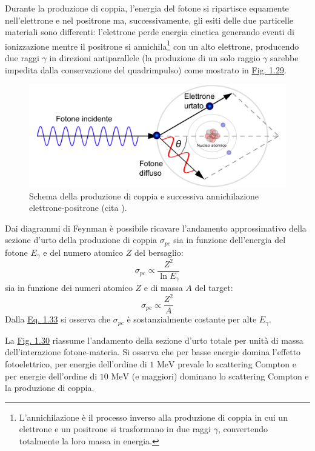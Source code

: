 \documentclass[12pt,a4paper,twoside]{report}
\begin{document}
	Durante la produzione di coppia, l'energia del fotone si ripartisce equamente nell'elettrone e nel positrone ma, successivamente, gli esiti delle due particelle materiali sono differenti: l'elettrone perde energia cinetica generando eventi di ionizzazione mentre il positrone si annichila\footnote{L'annichilazione è il processo inverso alla produzione di coppia in cui un elettrone e un positrone si trasformano in due raggi $\gamma$, convertendo totalmente la loro massa in energia.} con un alto elettrone, producendo due raggi $\gamma$ in direzioni antiparallele (la produzione di un solo raggio $\gamma$ sarebbe impedita dalla conservazione del quadrimpulso) come mostrato in \hyperref[fig:pair_production]{Fig. 1.29}.
	
	\begin{figure}[H]
		\centering
		\includegraphics[width=0.9\linewidth]{compton.pdf}
		\caption{Schema della produzione di coppia e successiva annichilazione elettrone-positrone (cita
			).}
		\label{fig:pair_production}
	\end{figure}
	
	Dai diagrammi di Feynman è possibile ricavare l'andamento approssimativo della sezione d'urto della produzione di coppia $\sigma_{pc}$ sia in funzione dell'energia del fotone $E_\gamma$ e del numero atomico $Z$ del bersaglio:
	\begin{equation}
		\sigma_{pc}\propto \frac{Z^2}{\ln{E_\gamma}}
		\label{eq:sigma_pc1}
	\end{equation}
	sia in funzione dei numeri atomico $Z$ e di massa $A$ del target:
	\begin{equation}
		\sigma_{pc}\propto \frac{Z^2}{A}
		\label{eq:sigma_pc2}
	\end{equation}
	Dalla \hyperref[eq:sigma_pc1]{Eq. 1.33} si osserva che $\sigma_{pc}$ è sostanzialmente costante per alte $E_\gamma$.	
	
	La \hyperref[fig:attenuation]{Fig. 1.30} riassume l'andamento della sezione d'urto totale per unità di massa dell'interazione fotone-materia. Si osserva che per basse energie domina l'effetto fotoelettrico, per energie dell'ordine di $1\mbox{ MeV}$ prevale lo scattering Compton e per energie dell'ordine di $10\mbox{ MeV}$ (e maggiori) dominano lo scattering Compton e la produzione di coppia.
	
\end{document}

